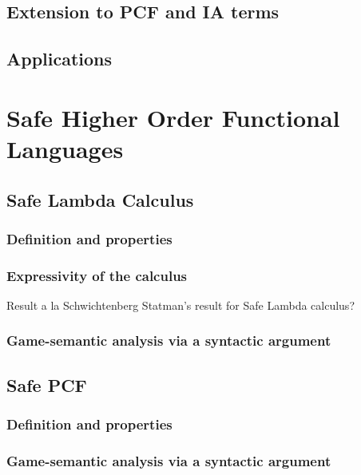     \section{Extension to PCF and IA terms}
    \section{Applications}



\chapter{Safe Higher Order Functional Languages}

    \section{Safe Lambda Calculus}
        \subsection{Definition and properties}
        \subsection{Expressivity of the calculus}
        Result a la Schwichtenberg \cite{citeulike:622637}
        Statman's result for Safe Lambda calculus?

        \subsection{Game-semantic analysis via a syntactic argument}
    \section{Safe PCF}
        \subsection{Definition and properties}
        \subsection{Game-semantic analysis via a syntactic argument}

    


